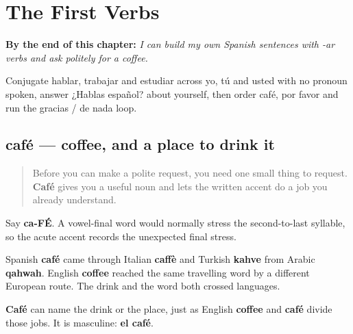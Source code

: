 
\chapter{The First Verbs}
\label{ch:first-verbs}

\begin{chapteropening}
\textbf{By the end of this chapter:} \emph{I can build my own Spanish sentences with -ar verbs and ask politely for a coffee.}

Conjugate hablar, trabajar and estudiar across yo, tú and usted with no pronoun spoken, answer ¿Hablas español? about yourself, then order café, por favor and run the gracias / de nada loop.
\end{chapteropening}

\section[café]{café — coffee, and a place to drink it}

\label{lesson:ES-C06-cafe}



\begin{quote}
Before you can make a polite request, you need one small thing to request. \textbf{Café} gives you a useful noun and lets the written accent do a job you already understand.
\end{quote}

\begin{sounds}
Say \textbf{ca-FÉ}. A vowel-final word would normally stress the second-to-last syllable, so the acute accent records the unexpected final stress.
\end{sounds}

\begin{cousinweb}
Spanish \textbf{café} came through Italian \textbf{caffè} and Turkish \textbf{kahve} from Arabic \textbf{qahwah}. English \textbf{coffee} reached the same travelling word by a different European route. The drink and the word both crossed languages.


\textbf{Café} can name the drink or the place, just as English \textbf{coffee} and \textbf{café} divide those jobs. It is masculine: \textbf{el café}.
\end{cousinweb}


